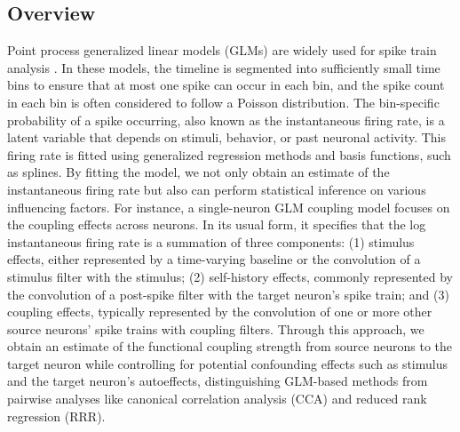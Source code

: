 \documentclass[12pt]{article}
\begin{document}
\subsection{Overview}
Point process generalized linear models (GLMs) are widely used for spike train analysis \cite{kass2001spike, truccolo2005point, pillow2008spatio}. In these models, the timeline is segmented into sufficiently small time bins to ensure that at most one spike can occur in each bin, and the spike count in each bin is often considered to follow a Poisson distribution. The bin-specific probability of a spike occurring, also known as the instantaneous firing rate, is a latent variable that depends on stimuli, behavior, or past neuronal activity. This firing rate is fitted using generalized regression methods and basis functions, such as splines. By fitting the model, we not only obtain an estimate of the instantaneous firing rate but also can perform statistical inference on various influencing factors. For instance, a single-neuron GLM coupling model focuses on the coupling effects across neurons. In its usual form, it specifies that the log instantaneous firing rate is a summation of three components: (1) stimulus effects, either represented by a time-varying baseline or the convolution of a stimulus filter with the stimulus; (2) self-history effects, commonly represented by the convolution of a post-spike filter with the target neuron's spike train; and (3) coupling effects, typically represented by the convolution of one or more other source neurons' spike trains with coupling filters. Through this approach, we obtain an estimate of the functional coupling strength from source neurons to the target neuron while controlling for potential confounding effects such as stimulus and the target neuron's autoeffects, distinguishing GLM-based methods from pairwise analyses like canonical correlation analysis (CCA) and reduced rank regression (RRR)\cite{kass2023identification, semedo2019cortical}. 
\end{document}

